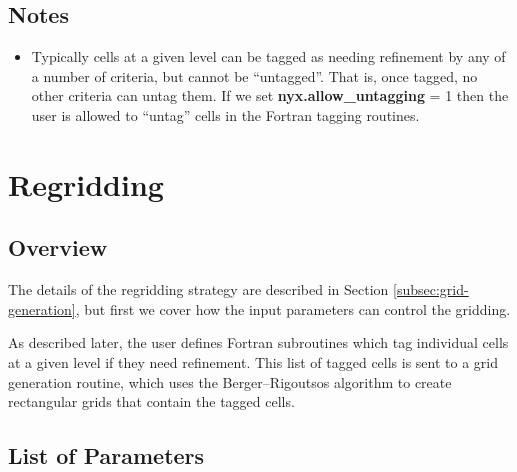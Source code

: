 \subsection{Notes}

\begin{itemize}
\item Typically cells at a given level can be tagged as needing refinement by any of a number
of criteria, but cannot be ``untagged''. That is, once tagged, no other criteria can untag them.   If
we set {\bf nyx.allow\_untagging} = 1 then the user is allowed to ``untag'' cells in the
Fortran tagging routines.
\end{itemize}

\section{Regridding}
\subsection{Overview}

The details of the regridding strategy are described in Section
\ref{subsec:grid-generation}, but first we 
cover how the input parameters can control the gridding.

As described later, the user defines Fortran subroutines which tag individual
cells at a given level if they need refinement.  This list of tagged cells is
sent to a grid generation routine, which uses the Berger--Rigoutsos algorithm
to create rectangular grids that contain the tagged cells.   

\subsection{List of Parameters}

